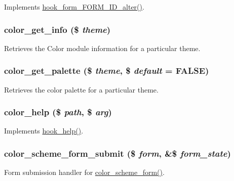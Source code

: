 \label{color_8module_aab51ce0c8130ac6b9a89cf081321ba8a}
Implements \hyperlink{group__hooks_ga8d4a4089551493d55911bd5c4f218264}{hook\_\-form\_\-FORM\_\-ID\_\-alter()}. \hypertarget{color_8module_aaf5fea9b55181881aa5f80d0410dccaa}{
\subsubsection[{color\_\-get\_\-info}]{\setlength{\rightskip}{0pt plus 5cm}color\_\-get\_\-info (\$ {\em theme})}}
\label{color_8module_aaf5fea9b55181881aa5f80d0410dccaa}
Retrieves the Color module information for a particular theme. \hypertarget{color_8module_a8d8c3577723eaa4e0adaa830acacff11}{
\subsubsection[{color\_\-get\_\-palette}]{\setlength{\rightskip}{0pt plus 5cm}color\_\-get\_\-palette (\$ {\em theme}, \/  \$ {\em default} = {\ttfamily FALSE})}}
\label{color_8module_a8d8c3577723eaa4e0adaa830acacff11}
Retrieves the color palette for a particular theme. \hypertarget{color_8module_a93cbd893662e9825fbf0e77c4390526a}{
\subsubsection[{color\_\-help}]{\setlength{\rightskip}{0pt plus 5cm}color\_\-help (\$ {\em path}, \/  \$ {\em arg})}}
\label{color_8module_a93cbd893662e9825fbf0e77c4390526a}
Implements \hyperlink{group__hooks_ga5589c2714a782738e8851c4c90231f0e}{hook\_\-help()}. \hypertarget{color_8module_a995f86a47f2e1456f113aa80c37b9a32}{
\subsubsection[{color\_\-scheme\_\-form\_\-submit}]{\setlength{\rightskip}{0pt plus 5cm}color\_\-scheme\_\-form\_\-submit (\$ {\em form}, \/  \&\$ {\em form\_\-state})}}
\label{color_8module_a995f86a47f2e1456f113aa80c37b9a32}
Form submission handler for \hyperlink{group__forms_ga96d9b56f10f5a4d4178d43444732fb09}{color\_\-scheme\_\-form()}.

